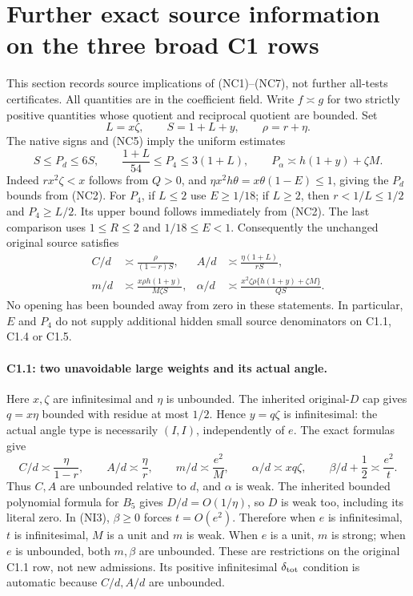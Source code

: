 \section[Further exact source information on the three broad C1 rows]{Further exact source information on the three broad C1 rows}
\label{sec:c1-residual-source-implications}

This section records source implications of (NC1)--(NC7), not further
all-tests certificates. All quantities are in the coefficient field.
Write $f\asymp g$ for two strictly positive quantities whose quotient
and reciprocal quotient are bounded. Set
\[
             L=x\zeta,\qquad S=1+L+y,\qquad \rho=r+\eta.
\]
The native signs and (NC5) imply the uniform estimates
\[
 S\le P_d\le6S,\qquad
 \frac{1+L}{54}\le P_4\le3(1+L),\qquad
 P_\alpha\asymp h(1+y)+\zeta M.                 \tag{NI1}
\]
Indeed $rx^2\zeta<x$ follows from $Q>0$, and
$\eta x^2h\theta=x\theta(1-E)\le1$, giving the $P_d$ bounds
from (NC2). For $P_4$, if $L\le2$ use $E\ge1/18$; if $L\ge2$,
then $r<1/L\le1/2$ and $P_4\ge L/2$. Its upper bound follows
immediately from (NC2). The last comparison uses $1\le R\le2$
and $1/18\le E<1$.
Consequently the unchanged original source satisfies
\begin{align*}
 C/d&\asymp\frac{\rho}{(1-r)S},&
 A/d&\asymp\frac{\eta(1+L)}{rS},\\
 m/d&\asymp\frac{x\rho h(1+y)}{M\zeta S},&
 \alpha/d&\asymp
 \frac{x^2\zeta\rho\{h(1+y)+\zeta M\}}{QS}.
 \tag{NI2}
\end{align*}
No opening has been bounded away from zero in these statements.
In particular, $E$ and $P_4$ do not supply additional hidden small
source denominators on C1.1, C1.4 or C1.5.

\paragraph{C1.1: two unavoidable large weights and its actual angle.}
Here $x,\zeta$ are infinitesimal and $\eta$ is unbounded.
The inherited original-$D$ cap gives $q=x\eta$ bounded with
residue at most $1/2$. Hence $y=q\zeta$ is infinitesimal:
the actual angle type is necessarily $(I,I)$, independently of $e$.
The exact formulas give
\[
 C/d\asymp\frac{\eta}{1-r},\qquad
 A/d\asymp\frac{\eta}{r},\qquad
 m/d\asymp\frac{e^2}{M},\qquad
 \alpha/d\asymp xq\zeta,\qquad
 \beta/d+\frac12\asymp\frac{e^2}{t}.             \tag{NI3}
\]
Thus $C,A$ are unbounded relative to $d$, and $\alpha$ is weak.
The inherited bounded polynomial formula for $B_5$ gives $D/d=O(1/\eta)$,
so $D$ is weak too, including its literal zero. In (NI3), $\beta\ge0$
forces $t=O(e^2)$. Therefore when $e$ is infinitesimal, $t$ is
infinitesimal, $M$ is a unit and $m$ is weak. When $e$ is a unit,
$m$ is strong; when $e$ is unbounded, both $m,\beta$ are unbounded.
These are restrictions on the original C1.1 row, not new admissions.
Its positive infinitesimal $\delta_{\rm tot}$ condition is automatic
because $C/d,A/d$ are unbounded.

